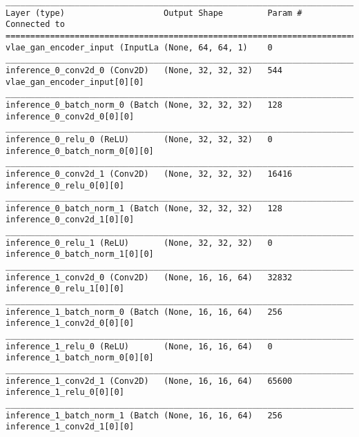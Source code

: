 \begin{lstlisting}[caption={dSprites-VLAE-GAN Encoder},captionpos=b,basicstyle=\tiny, label={lst:mnist-vlae-gan-encoder}]
__________________________________________________________________________________________________
Layer (type)                    Output Shape         Param #     Connected to
==================================================================================================
vlae_gan_encoder_input (InputLa (None, 64, 64, 1)    0
__________________________________________________________________________________________________
inference_0_conv2d_0 (Conv2D)   (None, 32, 32, 32)   544         vlae_gan_encoder_input[0][0]
__________________________________________________________________________________________________
inference_0_batch_norm_0 (Batch (None, 32, 32, 32)   128         inference_0_conv2d_0[0][0]
__________________________________________________________________________________________________
inference_0_relu_0 (ReLU)       (None, 32, 32, 32)   0           inference_0_batch_norm_0[0][0]
__________________________________________________________________________________________________
inference_0_conv2d_1 (Conv2D)   (None, 32, 32, 32)   16416       inference_0_relu_0[0][0]
__________________________________________________________________________________________________
inference_0_batch_norm_1 (Batch (None, 32, 32, 32)   128         inference_0_conv2d_1[0][0]
__________________________________________________________________________________________________
inference_0_relu_1 (ReLU)       (None, 32, 32, 32)   0           inference_0_batch_norm_1[0][0]
__________________________________________________________________________________________________
inference_1_conv2d_0 (Conv2D)   (None, 16, 16, 64)   32832       inference_0_relu_1[0][0]
__________________________________________________________________________________________________
inference_1_batch_norm_0 (Batch (None, 16, 16, 64)   256         inference_1_conv2d_0[0][0]
__________________________________________________________________________________________________
inference_1_relu_0 (ReLU)       (None, 16, 16, 64)   0           inference_1_batch_norm_0[0][0]
__________________________________________________________________________________________________
inference_1_conv2d_1 (Conv2D)   (None, 16, 16, 64)   65600       inference_1_relu_0[0][0]
__________________________________________________________________________________________________
inference_1_batch_norm_1 (Batch (None, 16, 16, 64)   256         inference_1_conv2d_1[0][0]

\end{lstlisting}
